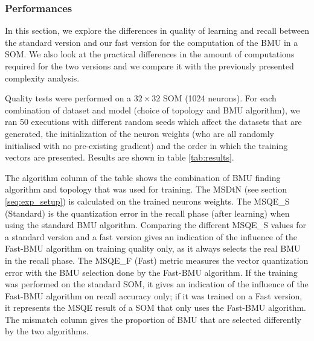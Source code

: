 	\subsubsection{Performances}

	In this section, we explore the differences in quality of learning and recall between the standard version and our fast version for the computation of the BMU in a SOM. We also look at the practical differences in the amount of computations required for the two versions and we compare it with the previously presented complexity analysis.
	
	Quality tests were performed on a $32\times32$ SOM (1024 neurons). For each combination of dataset and model (choice of topology and BMU algorithm), we ran 50 executions with different random seeds which affect the datasets that are generated, the initialization of the neuron weights (who are all randomly initialised with no pre-existing gradient) and the order in which the training vectors are presented. Results are shown in table \ref{tab:results}.

	The algorithm column of the table shows the combination of BMU finding algorithm and topology that was used for training. The MSDtN (see section \ref{seq:exp_setup}) is calculated on the trained neurons weights. The MSQE\_S (Standard) is the quantization error in the recall phase (after learning) when using the standard BMU algorithm. Comparing the different MSQE\_S values for a standard version and a fast version gives an indication of the influence of the Fast-BMU algorithm on training quality only, as it always selects the real BMU in the recall phase. The MSQE\_F (Fast) metric measures the vector quantization error with the BMU selection done by the Fast-BMU algorithm. If the training was performed on the standard SOM, it gives an indication of the influence of the Fast-BMU algorithm on recall accuracy only; if it was trained on a Fast version, it represents the MSQE result of a SOM that only uses the Fast-BMU algorithm. The mismatch column gives the proportion of BMU that are selected differently by the two algorithms.


